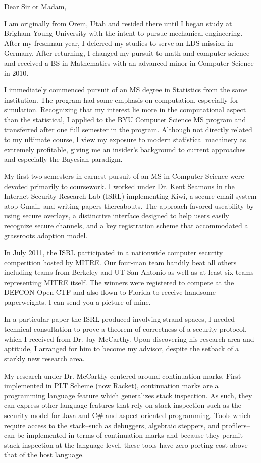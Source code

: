 \documentclass{letter}
\begin{document}
\begin{letter}{}

\opening{Dear Sir or Madam,}

I am originally from Orem, Utah and resided there until I began study at Brigham Young 
University with the intent to pursue mechanical engineering. After my freshman year, I 
deferred my studies to serve an LDS mission in Germany. After returning, I changed my 
pursuit to math and computer science and received a BS in Mathematics with an advanced 
minor in Computer Science in 2010.

I immediately commenced pursuit of an MS degree 
in Statistics from the same institution. The program had some emphasis on computation, 
especially for simulation. Recognizing that my interest lie more in the computational 
aspect than the statistical, I applied to the BYU Computer Science MS program and transferred after 
one full semester in the program. Although not directly related to my ultimate course, I view my exposure to 
modern statistical machinery as extremely profitable, giving me an insider's background 
to current approaches and especially the Bayesian paradigm.

My first two semesters in earnest pursuit of an MS in Computer Science were devoted 
primarily to coursework. I worked under Dr. Kent Seamons in the Internet Security Research
Lab (ISRL) implementing Kiwi, a secure email system atop Gmail, and writing papers thereabouts. 
The approach favored useability by using secure overlays, a distinctive interface designed 
to help users easily recognize secure channels, and a key registration scheme that 
accommodated a grassroots adoption model.

In July 2011, the ISRL participated in a nationwide computer security competition hosted by MITRE. Our 
four-man team handily beat all others including teams from Berkeley and UT San Antonio as well 
as at least six teams representing MITRE itself. The winners were registered to compete at the 
DEFCON Open CTF and also flown to Florida to receive handsome paperweights. I can send you a 
picture of mine.

In a particular paper the ISRL produced involving strand spaces, I needed technical consultation 
to prove a theorem of correctness of a security protocol, which I received from Dr. Jay McCarthy. 
Upon discovering his research area and aptitude, I arranged for him to become my advisor, despite 
the setback of a starkly new research area.

My research under Dr. McCarthy centered around continuation marks. First implemented in PLT 
Scheme (now Racket), continuation marks are a programming language feature which generalizes 
stack inspection. As such, they can express other language features that rely on stack inspection 
such as the security model for Java and C\# and aspect-oriented programming. Tools which require 
access to the stack--such as debuggers, algebraic steppers, and profilers--can be implemented in 
terms of continuation marks and because they permit stack inspection at the language level, these 
tools have zero porting cost above that of the host language.


\end{letter}
\end{document}
